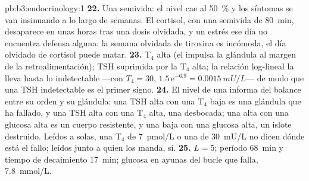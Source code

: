 \begin{solution}{pb:b3:endocrinology:1}
\textbf{22.} Una semivida: el nivel cae al \qty{50}{\%} y los síntomas
se van insinuando a lo largo de semanas. El cortisol, con una semivida
de \qty{80}{min}, desaparece en unas horas tras una dosis olvidada, y
un estrés ese día no encuentra defensa alguna: la semana olvidada de
tiroxina es incómoda, el día olvidado de cortisol puede matar.
\textbf{23.} T$_{4}$ alta (el  impulsa la glándula al margen
de la retroalimentación); TSH suprimida por la T$_{4}$ alta; la
relación log-lineal la lleva hasta lo indetectable ---con $T_{4} = 30$,
$1.5\,\mathrm{e}^{-6.9}
= \qty{0.0015}{mU/L}$--- de modo que una TSH indetectable es el primer
signo.
\textbf{24.} El nivel de una  informa del balance entre su orden
y su glándula: una TSH alta con una T$_{4}$ baja es una glándula que ha
fallado, y una TSH alta con una T$_{4}$ alta, una 
desbocada; una  alta con una glucosa alta es un cuerpo
resistente, y una  baja con una glucosa alta, un islote
destruido. Leídos a solas, una T$_{4}$ de \qty{7}{pmol/L} o una
 de \qty{30}{mU/L} no dicen dónde está el fallo; leídos junto a
quien los manda, sí.
\textbf{25.}  $L = 5$; período \qty{68}{min} y tiempo
de decaimiento \qty{17}{min}; glucosa en ayunas del bucle que falla,
\qty{7.8}{mmol/L}.
\end{solution}
